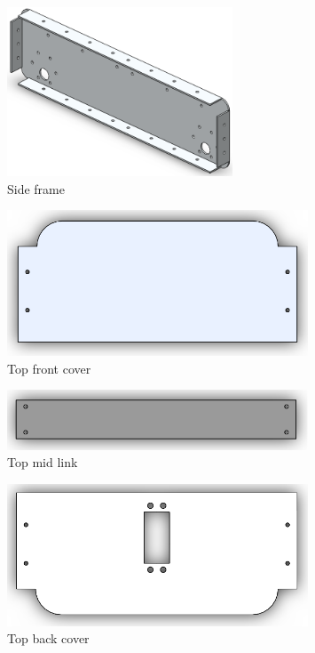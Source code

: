 \documentclass[12pt]{article}
\begin{document}
\begin{figure}[H]
	\centering
	\includegraphics[width =0.6\textwidth]{Fig/solid/side-frame.png}
	\caption{Side frame}
\end{figure}

\begin{figure}[H]
	\centering
	\includegraphics[width =0.8\textwidth]{Fig/solid/top-front-cover.png}
	\caption{Top front cover}
\end{figure}

\begin{figure}[H]
	\centering
	\includegraphics[width =0.8\textwidth]{Fig/solid/mid-part.png}
	\caption{Top mid link}
\end{figure}

\begin{figure}[H]
	\centering
	\includegraphics[width =0.8\textwidth]{Fig/solid/top-back-cover.png}
	\caption{Top back cover}
\end{figure}
\end{document}
